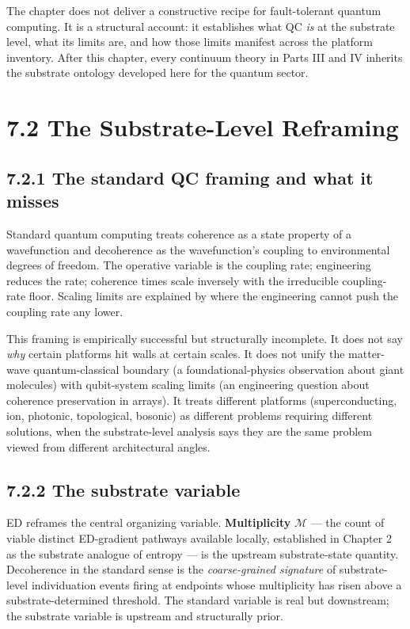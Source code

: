 \documentclass[11pt]{book}
\begin{document}
The chapter does not deliver a constructive recipe for fault-tolerant quantum computing. It is a structural account: it establishes what QC \textit{is} at the substrate level, what its limits are, and how those limits manifest across the platform inventory. After this chapter, every continuum theory in Parts III and IV inherits the substrate ontology developed here for the quantum sector.

\section{7.2 The Substrate-Level Reframing}

\subsection{7.2.1 The standard QC framing and what it misses}

Standard quantum computing treats coherence as a state property of a wavefunction and decoherence as the wavefunction's coupling to environmental degrees of freedom. The operative variable is the coupling rate; engineering reduces the rate; coherence times scale inversely with the irreducible coupling-rate floor. Scaling limits are explained by where the engineering cannot push the coupling rate any lower.

This framing is empirically successful but structurally incomplete. It does not say \textit{why} certain platforms hit walls at certain scales. It does not unify the matter-wave quantum-classical boundary (a foundational-physics observation about giant molecules) with qubit-system scaling limits (an engineering question about coherence preservation in arrays). It treats different platforms (superconducting, ion, photonic, topological, bosonic) as different problems requiring different solutions, when the substrate-level analysis says they are the same problem viewed from different architectural angles.

\subsection{7.2.2 The substrate variable}

ED reframes the central organizing variable. \textbf{Multiplicity} $\mathcal{M}$ — the count of viable distinct ED-gradient pathways available locally, established in Chapter 2 as the substrate analogue of entropy — is the upstream substrate-state quantity. Decoherence in the standard sense is the \textit{coarse-grained signature} of substrate-level individuation events firing at endpoints whose multiplicity has risen above a substrate-determined threshold. The standard variable is real but downstream; the substrate variable is upstream and structurally prior.
\end{document}
